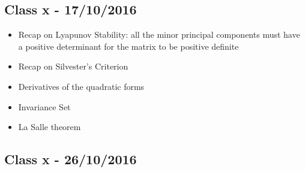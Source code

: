 \subsection*{Class x -  17/10/2016}


\begin{itemize}
\item Recap on Lyapunov Stability: all the minor principal components must have a positive determinant for the matrix to be positive definite
\item Recap on Silvester's Criterion
\item Derivatives of the quadratic forms
\item Invariance Set
\item La Salle theorem
\end{itemize}
\subsection*{Class x -  26/10/2016}